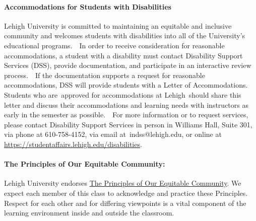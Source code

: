 \documentclass[11pt]{article}
\begin{document}
\paragraph{Accommodations for Students with Disabilities}
Lehigh University is committed to maintaining an equitable and inclusive community and welcomes students with disabilities into all of the University’s educational programs.  In order to receive consideration for reasonable accommodations, a student with a disability must contact Disability Support Services (DSS), provide documentation, and participate in an interactive review process.  If the documentation supports a request for reasonable accommodations, DSS will provide students with a Letter of Accommodations. Students who are approved for accommodations at Lehigh should share this letter and discuss their accommodations and learning needs with instructors as early in the semester as possible.  For more information or to request services, please contact Disability Support Services in person in Williams Hall, Suite 301, via phone at 610-758-4152, via email at indss@lehigh.edu, or online at \url{https://studentaffairs.lehigh.edu/disabilities}.

\paragraph{The Principles of Our Equitable Community:}
Lehigh University endorses \href{http://www.lehigh.edu/~inprv/initiatives/PrinciplesEquity_Sheet_v2_032212.pdf}{The Principles of Our Equitable Community}. We expect each member of this class to acknowledge and practice these Principles. Respect for each other and for differing viewpoints is a vital component of the learning environment inside and outside the classroom.
\end{document}
